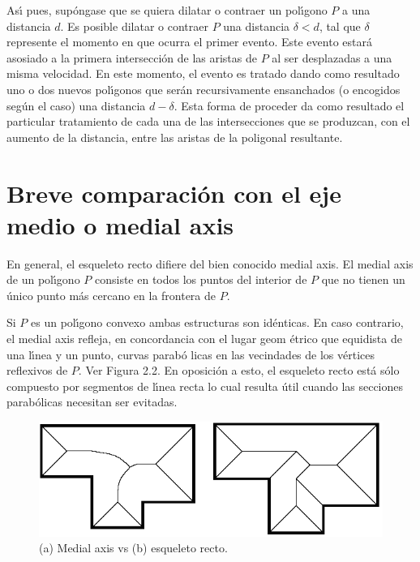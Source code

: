 \documentclass[12pt,english]{report}
\begin{document}
As\'{\i} pues, sup\'{o}ngase que se quiera dilatar o contraer un pol\'{\i}gono $P$ a
una distancia $d$. Es posible dilatar o contraer $P$ una distancia $\delta
<d $, tal que $\delta $ represente el momento en que ocurr{a} el primer
evento. Este evento estar\'{a} asosiado a la primera intersecci\'{o}n de las
aristas de $P$ al ser desplazadas a una misma velocidad. En este momento, el evento es tratado dando como resultado
uno o dos nuevos pol\'{\i}gonos que ser\'{a}n recursivamente ensanchados (o
encogidos seg\'{u}n el caso) una distancia $d-\delta $. Esta forma de
proceder da como resultado el particular tratamiento de cada una de las
intersecciones que se produzcan, con el aumento de la distancia, entre las
aristas de la poligonal resultante.

\section{Breve comparaci\'{o}n con el eje medio o medial axis}

En general, el esqueleto recto difiere del bien conocido medial axis. El
medial axis de un pol\'{\i}gono $P$ consiste en todos los puntos del
interior de $P$ que no tienen un \'{u}nico punto m\'{a}s cercano en la
frontera de $P$.

Si $P$ es un pol\'{\i}gono convexo ambas estructuras son id\'{e}nticas. En
caso contrario, el medial axis refleja, en concordancia con el lugar geom%
\'{e}trico que equidista de una l\'{\i}nea y un punto, curvas parab\'{o}%
licas en las vecindades de los v\'{e}rtices reflexivos de $P$. Ver Figura
2.2. En oposici\'{o}n a esto, el esqueleto recto est\'{a} s\'{o}lo compuesto
por segmentos de l\'{\i}nea recta lo cual resulta \'{u}til cuando las
secciones parab\'{o}licas necesitan ser evitadas.

\begin{figure}[htbp]
\begin{center}
\includegraphics[width=15cm]{med.png}
\end{center}
\caption{(a) Medial axis vs (b) esqueleto recto.}
\end{figure}
\end{document}
